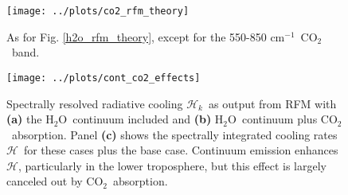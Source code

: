 \documentclass{ametsoc}
\newcommand{\cminverse}{\ensuremath{\mathrm{cm^{-1}}}}
\newcommand{\cotwo}{\ensuremath{\mathrm{CO_2}}}
\newcommand{\htwo}{\ensuremath{\mathrm{H_2O}}}
\newcommand{\ch}{\ensuremath{\mathcal{H}}}
\newcommand{\chk}{\ensuremath{\ch_k}}
\begin{document}
\begin{figure}[h]
	\begin{center}
			\texttt{[image: ../plots/co2\_rfm\_theory]}
		\caption{As for Fig. \ref{h2o_rfm_theory}, except for the 550-850 \cminverse\ \cotwo\ band.
		\label{co2_rfm_theory}
		}
	\end{center}
\end{figure}



\begin{figure}[h]
	\begin{center}
			\texttt{[image: ../plots/cont\_co2\_effects]}
		\caption{Spectrally resolved radiative cooling \chk\ as output from RFM with \textbf{(a)} the \htwo\ continuum included and \textbf{(b)} \htwo\ continuum plus \cotwo\ absorption. Panel \textbf{(c)} shows the spectrally integrated cooling rates \ch\ for these cases plus the base case. Continuum emission enhances \ch, particularly in the lower troposphere, but this effect is largely canceled out by \cotwo\ absorption. 
		\label{cont_co2_effects}
		}
	\end{center}
\end{figure}



\end{document}
